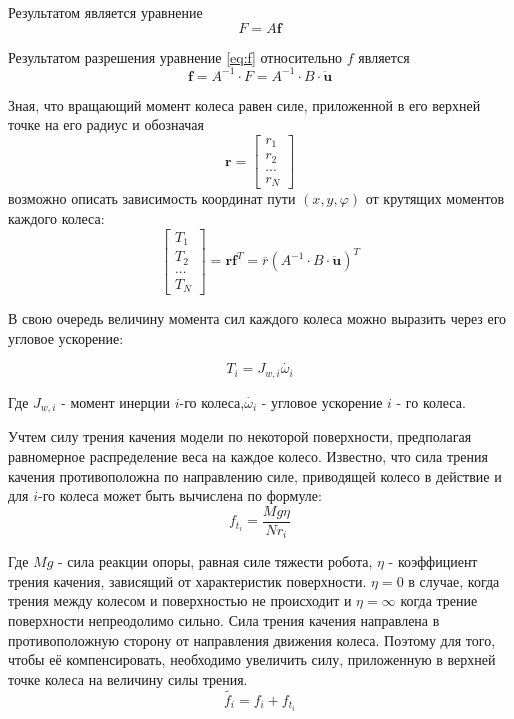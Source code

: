 \documentclass[oneside,final,14pt]{extreport}
\newcommand{\bs}{\boldsymbol}
\begin{document}
Результатом является уравнение
\begin{equation}
F = A\bs{f}
\label{eq:f}
\end{equation}

Результатом разрешения уравнение \ref{eq:f} относительно $f$ является
\begin{equation}
\bs{f}
=
A^{-1}
\cdot
F
=
A^{-1}
\cdot
B 
\cdot
\bs{
\ddot{u}
}
\end{equation}

Зная, что вращающий момент колеса равен силе, приложенной в его верхней точке на его радиус и обозначая 
\begin{equation}
\bs{r} 
=
\begin{bmatrix}
r_{1} \\
r_{2} \\
... \\
r_{N}
\end{bmatrix}
\end{equation}
возможно описать зависимость координат пути $(x,y,\varphi)$ от крутящих моментов каждого колеса:
\begin{equation}
\label{eq:dynamic_w_friction}
\begin{bmatrix}
T_{1} \\
T_{2} \\
... \\
T_{N}
\end{bmatrix}
=
\bs{r}
\bs{
f}
^{T}
=
\overline{r}
(
A^{-1}
\cdot
B 
\cdot
\bs{\ddot{u}}
)^{T}
\end{equation}

В свою очередь величину момента сил каждого колеса можно выразить через его угловое ускорение:

\begin{equation}
T_{i}
=
J_{w,i}\dot{\omega_{i}}
\end{equation}

Где $J_{w,i}$ - момент инерции $i$-го колеса,$\dot{\omega_{i}}$ - угловое ускорение $i$ - го колеса.

Учтем силу трения качения модели по некоторой поверхности, предполагая равномерное распределение веса на каждое колесо. Известно, что сила трения качения противоположна по направлению силе, приводящей колесо в действие и для $i$-го колеса может быть вычислена по формуле:
\begin{equation}
f_{t_{i}}
=
\frac{Mg\eta}{Nr_{i}}
\end{equation}

Где $Mg$ - сила реакции опоры, равная силе тяжести робота, $\eta$ - коэффициент трения качения, зависящий от характеристик поверхности. $\eta = 0$ в случае, когда трения между колесом и поверхностью не происходит и $\eta = \infty$ когда трение поверхности непреодолимо сильно.  
Сила трения качения направлена в противоположную сторону от направления движения колеса. Поэтому для того, чтобы её компенсировать, необходимо увеличить силу, приложенную в верхней точке колеса на величину силы трения.
\begin{equation}
\tilde{f_{i}}
=
f_{i}
+
f_{t_{i}}
\end{equation}
\end{document}
